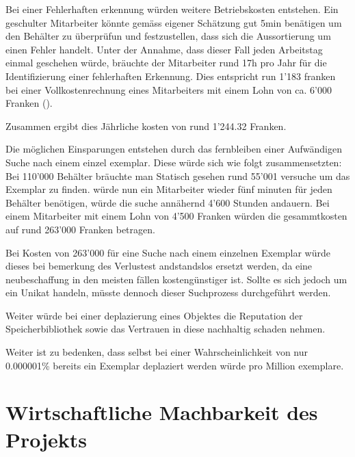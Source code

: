 Bei einer Fehlerhaften erkennung würden weitere Betriebskosten entstehen. Ein geschulter Mitarbeiter könnte gemäss eigener Schätzung gut 5min benätigen um den Behälter zu überprüfun und festzustellen, dass sich die Aussortierung um einen Fehler handelt.
Unter der Annahme, dass dieser Fall jeden Arbeitstag einmal geschehen würde, bräuchte der Mitarbeiter rund 17h pro Jahr für die Identifizierung einer fehlerhaften Erkennung. Dies entspricht run 1'183 franken bei einer Vollkostenrechnung eines Mitarbeiters mit einem Lohn von ca. 6'000 Franken (\cite{KostenProMitarbeiter2013}).

Zusammen ergibt dies Jährliche kosten von rund 1'244.32 Franken.

Die möglichen Einsparungen entstehen durch das fernbleiben einer Aufwändigen Suche nach einem einzel exemplar. Diese würde sich wie folgt zusammensetzten:
Bei 110'000 Behälter bräuchte man Statisch gesehen rund 55'001 versuche um das Exemplar zu finden. würde nun ein Mitarbeiter wieder fünf minuten für jeden Behälter benötigen, würde die suche annähernd 4'600 Stunden andauern. Bei einem Mitarbeiter mit einem Lohn von 4'500 Franken würden die gesammtkosten auf rund 263'000 Franken betragen.

Bei Kosten von 263'000 für eine Suche nach einem einzelnen Exemplar würde dieses bei bemerkung des Verlustest andstandslos ersetzt werden, da eine neubeschaffung in den meisten fällen kostengünstiger ist. Sollte es sich jedoch um ein Unikat handeln, müsste dennoch dieser Suchprozess durchgeführt werden.

Weiter würde bei einer deplazierung eines Objektes die Reputation der Speicherbibliothek sowie das Vertrauen in diese nachhaltig schaden nehmen.

Weiter ist zu bedenken, dass selbst bei einer Wahrscheinlichkeit von nur 0.000001\% bereits ein Exemplar deplaziert werden würde pro Million exemplare.

\chapter{Wirtschaftliche Machbarkeit des Projekts}



